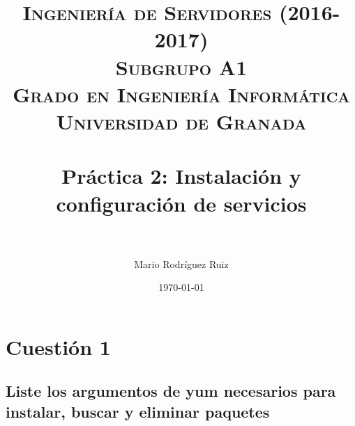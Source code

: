 


\title{	
\normalfont \normalsize 
\textsc{\textbf{Ingeniería de Servidores (2016-2017)} \\ Subgrupo A1 \\ Grado en Ingeniería Informática\\ Universidad de Granada} \\ [25pt] %
\horrule{0.5pt} \\[0.4cm] %
\huge Práctica 2: Instalación y configuración de servicios \\ %
\horrule{2pt} \\[0.5cm] %
}

\author{Mario Rodríguez Ruiz} %

\date{\normalsize\today} %




\maketitle %

\newpage %

\tableofcontents %

\listoffigures

\newpage


\section{Cuestión 1}
\subsection{Liste los argumentos de yum necesarios para instalar,
	buscar y eliminar paquetes}


